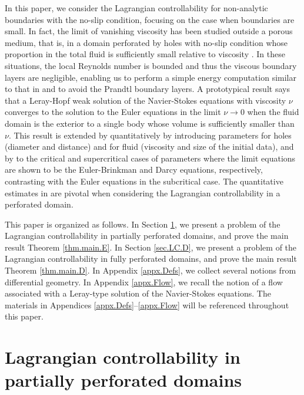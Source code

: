 \documentclass[11pt,a4paper]{article}
\numberwithin{equation}{section}
\begin{document}
In this paper, we consider the Lagrangian controllability for non-analytic boundaries with the no-slip condition, focusing on the case when boundaries are small. In fact, the limit of vanishing viscosity has been studied outside a porous medium, that is, in a domain perforated by holes with no-slip condition whose proportion in the total fluid is sufficiently small relative to viscosity \cite{ILFNL09,LacMaz16,Hof23}. In these situations, the local Reynolds number is bounded and thus the viscous boundary layers are negligible, enabling us to perform a simple energy computation similar to that in \cite{Kato84} and to avoid the Prandtl boundary layers. A prototypical result \cite[Theorem 1]{ILFNL09} says that a Leray-Hopf weak solution of the Navier-Stokes equations with viscosity $\nu$ converges to the solution to the Euler equations in the limit $\nu\to0$ when the fluid domain is the exterior to a single body whose volume is sufficiently smaller than $\nu$. This result is extended by \cite{LacMaz16} quantitatively by introducing parameters for holes (diameter and distance) and for fluid (viscosity and size of the initial data), and by \cite{Hof23} to the critical and supercritical cases of parameters where the limit equations are shown to be the Euler-Brinkman and Darcy equations, respectively, contrasting with the Euler equations in the subcritical case. The quantitative estimates in \cite{LacMaz16,Hof23} are pivotal when considering the Lagrangian controllability in a perforated domain. 


This paper is organized as follows. In Section \ref{sec.LC.E}, we present a problem of the Lagrangian controllability in partially perforated domains, and prove the main result Theorem \ref{thm.main.E}. In Section \ref{sec.LC.D}, we present a problem of the Lagrangian controllability in fully perforated domains, and prove the main result Theorem \ref{thm.main.D}. In Appendix \ref{appx.Defs}, we collect several notions from differential geometry. In Appendix \ref{appx.Flow}, we recall the notion of a flow associated with a Leray-type solution of the Navier-Stokes equations. The materials in Appendices \ref{appx.Defs}--\ref{appx.Flow} will be referenced throughout this paper. 


    \section{Lagrangian controllability in partially perforated domains}
    \label{sec.LC.E}
\end{document}
